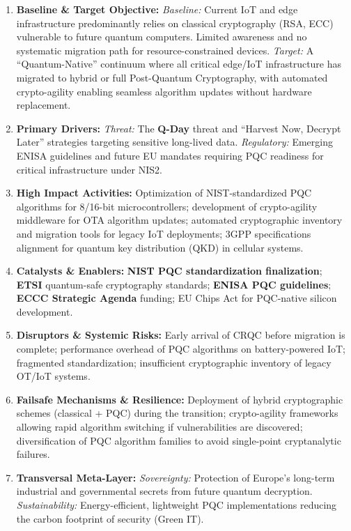\documentclass[12pt,a4paper]{article}
\begin{document}
\begin{enumerate}
\item \textbf{Baseline \& Target Objective:}
\textit{Baseline:} Current IoT and edge infrastructure predominantly relies on classical cryptography (RSA, ECC) vulnerable to future quantum computers. Limited awareness and no systematic migration path for resource-constrained devices.
\textit{Target:} A ``Quantum-Native'' continuum where all critical edge/IoT infrastructure has migrated to hybrid or full Post-Quantum Cryptography, with automated crypto-agility enabling seamless algorithm updates without hardware replacement.

\item \textbf{Primary Drivers:} 
\textit{Threat:} The \textbf{Q-Day} threat and ``Harvest Now, Decrypt Later'' strategies targeting sensitive long-lived data.
\textit{Regulatory:} Emerging ENISA guidelines and future EU mandates requiring PQC readiness for critical infrastructure under NIS2.

\item \textbf{High Impact Activities:} 
Optimization of NIST-standardized PQC algorithms for 8/16-bit microcontrollers; development of crypto-agility middleware for OTA algorithm updates; automated cryptographic inventory and migration tools for legacy IoT deployments; 3GPP specifications alignment for quantum key distribution (QKD) in cellular systems.

\item \textbf{Catalysts \& Enablers:} 
\textbf{NIST PQC standardization finalization}; \textbf{ETSI} quantum-safe cryptography standards; \textbf{ENISA PQC guidelines}; \textbf{ECCC Strategic Agenda} funding; EU Chips Act for PQC-native silicon development.

\item \textbf{Disruptors \& Systemic Risks:} 
Early arrival of CRQC before migration is complete; performance overhead of PQC algorithms on battery-powered IoT; fragmented standardization; insufficient cryptographic inventory of legacy OT/IoT systems.

\item \textbf{Failsafe Mechanisms \& Resilience:} 
Deployment of hybrid cryptographic schemes (classical + PQC) during the transition; crypto-agility frameworks allowing rapid algorithm switching if vulnerabilities are discovered; diversification of PQC algorithm families to avoid single-point cryptanalytic failures.

\item \textbf{Transversal Meta-Layer:} 
\textit{Sovereignty:} Protection of Europe's long-term industrial and governmental secrets from future quantum decryption. \textit{Sustainability:} Energy-efficient, lightweight PQC implementations reducing the carbon footprint of security (Green IT).

\end{enumerate}
\end{document}
